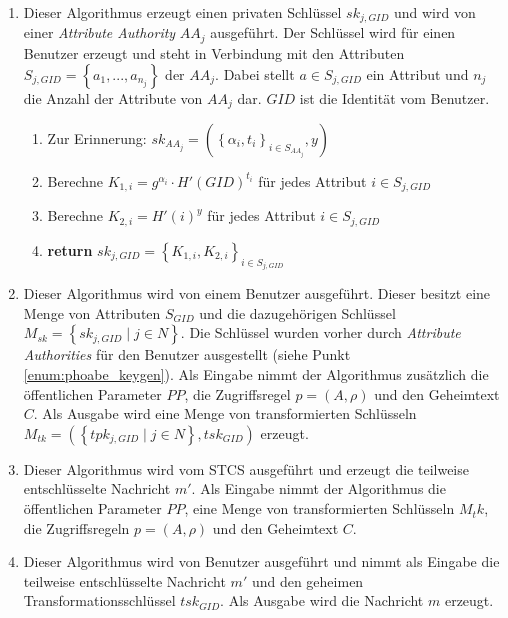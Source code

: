 \begin{enumerate}
	\item\label{enum:phoabe_keygen}  Dieser Algorithmus erzeugt einen privaten
		Schlüssel $sk_{j, GID}$ und wird von einer \textit{Attribute Authority}
		$AA_j$ ausgeführt. Der Schlüssel wird für einen Benutzer erzeugt und steht
		in Verbindung mit den Attributen $S_{j, GID} = \left\{ a_1, ..., a_{n_j}
		\right\}$ der $AA_j$.  Dabei stellt $a \in S_{j, GID}$ ein Attribut und
		$n_j$ die Anzahl der Attribute von $AA_j$ dar. $GID$ ist die Identität vom
		Benutzer.
		\begin{enumerate}
			\item Zur Erinnerung: $sk_{AA_j} = \left(\left\{\alpha_i, t_i\right\}_{i
				\in S_{AA_j}}, y\right)$
			\item Berechne $K_{1,i} = g^{\alpha_i} \cdot H'(GID)^{t_i}$ für jedes
				Attribut $i \in S_{j, GID}$
			\item Berechne $K_{2,i} = H'(i)^{y}$ für jedes Attribut $i \in S_{j,GID}$
			\item \textbf{return} $sk_{j, GID} = \left\{ K_{1,i}, K_{2,i} \right\}_{i
				\in S_{j, GID}}$
		\end{enumerate}

	\item {} Dieser Algorithmus
		wird von einem Benutzer ausgeführt. Dieser besitzt eine Menge von
		Attributen $S_{GID}$ und die dazugehörigen Schlüssel $M_{sk} = \left\{
		sk_{j, GID} \;\vert\; j \in N \right\}$. Die Schlüssel wurden vorher durch
		\textit{Attribute Authorities} für den Benutzer ausgestellt (siehe Punkt
		\ref{enum:phoabe_keygen}). Als Eingabe nimmt der Algorithmus zusätzlich
		die öffentlichen Parameter $PP$, die Zugriffsregel $p = \left(A,
		\rho\right)$ und den Geheimtext $C$. Als Ausgabe wird eine Menge von
		transformierten Schlüsseln $M_{tk} = \left( \left\{tpk_{j, GID} \;\vert\;
		j \in N\right\}, tsk_{GID} \right)$ erzeugt.

	\item {} Dieser Algorithmus wird
		vom STCS ausgeführt und erzeugt die teilweise entschlüsselte Nachricht
		$m'$. Als Eingabe nimmt der Algorithmus die öffentlichen Parameter $PP$,
		eine Menge von transformierten Schlüsseln $M_tk$, die Zugriffsregeln $p =
		\left(A, \rho\right)$ und den Geheimtext $C$.

	\item {} Dieser Algorithmus wird von
		Benutzer ausgeführt und nimmt als Eingabe die teilweise entschlüsselte
		Nachricht $m'$ und den geheimen Transformationsschlüssel $tsk_{GID}$. Als
		Ausgabe wird die Nachricht $m$ erzeugt.
\end{enumerate}

